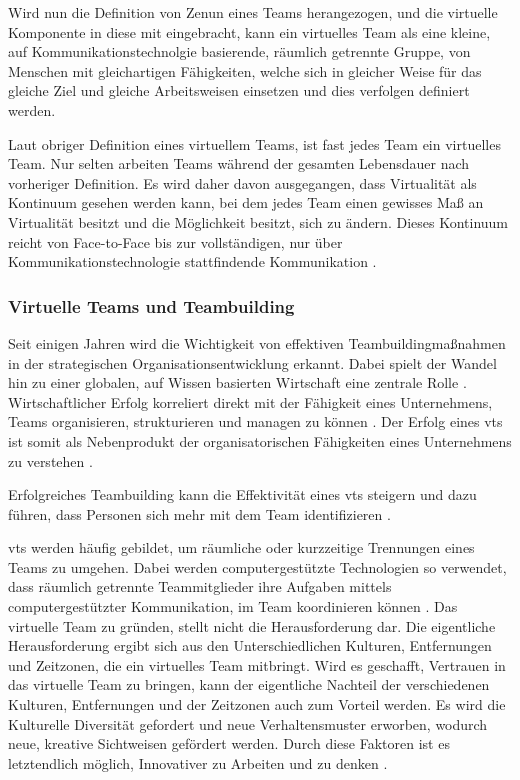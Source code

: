 \documentclass[a4paper,11pt]{article}%
\renewcommand{\\}{\vspace*{0.5\baselineskip} \newline}
\begin{document}
Wird nun die Definition von Zenun \citep[p.2]{zenun2007effects} eines Teams herangezogen, und die virtuelle Komponente in diese mit eingebracht, kann ein virtuelles Team als \\
\dq{}eine kleine, auf Kommunikationstechnolgie basierende, räumlich getrennte Gruppe, von Menschen mit gleichartigen Fähigkeiten, welche sich in gleicher Weise für das gleiche Ziel und gleiche Arbeitsweisen einsetzen und dies verfolgen\dq{} \\
definiert werden.

Laut obriger Definition eines virtuellem Teams, ist fast jedes Team ein virtuelles Team. Nur selten arbeiten Teams während der gesamten Lebensdauer nach vorheriger Definition. Es wird daher davon ausgegangen, dass Virtualität als Kontinuum gesehen werden kann, bei dem jedes Team einen gewisses Maß an Virtualität besitzt und die Möglichkeit besitzt, sich zu ändern. Dieses Kontinuum reicht von Face-to-Face bis zur vollständigen, nur über Kommunikationstechnologie stattfindende Kommunikation \cite{martins2004virtual}.
\subsubsection{Virtuelle Teams und Teambuilding}

Seit einigen Jahren wird die Wichtigkeit von effektiven Teambuildingmaßnahmen in der strategischen Organisationsentwicklung erkannt. Dabei spielt der Wandel hin zu einer globalen, auf Wissen basierten Wirtschaft eine zentrale Rolle \citep{belbin2011management} \citep[p.7]{katzenbach2015wisdom}.
Wirtschaftlicher Erfolg korreliert direkt mit der Fähigkeit eines Unternehmens, Teams organisieren, strukturieren und managen zu können \citep{pasmore1993designing}.
Der Erfolg eines \ac{vts} ist somit als Nebenprodukt der organisatorischen Fähigkeiten eines Unternehmens zu verstehen \citep[p.5]{kling1994social}.

Erfolgreiches Teambuilding kann die Effektivität eines \ac{vts} steigern und dazu führen, dass Personen sich mehr mit dem Team identifizieren \citep{kaiser2000student}.

\ac{vts} werden häufig gebildet, um räumliche oder kurzzeitige Trennungen eines Teams zu umgehen. Dabei werden computergestützte Technologien so verwendet, dass räumlich getrennte Teammitglieder ihre Aufgaben mittels computergestützter Kommunikation, im Team koordinieren können \citep[p. 117-119]{peters2007identifying} \citep[p. 1-2]{cascio2003leadership}.
Das virtuelle Team zu gründen, stellt nicht die Herausforderung dar. Die eigentliche Herausforderung ergibt sich aus den Unterschiedlichen Kulturen, Entfernungen und Zeitzonen, die ein virtuelles Team mitbringt. Wird es geschafft, Vertrauen in das virtuelle Team zu bringen, kann der eigentliche Nachteil der verschiedenen Kulturen, Entfernungen und der Zeitzonen auch zum Vorteil werden. Es wird die Kulturelle Diversität gefordert und neue Verhaltensmuster erworben, wodurch neue, kreative Sichtweisen gefördert werden. Durch diese Faktoren ist es letztendlich möglich, Innovativer zu Arbeiten und zu denken \citep{dyer1995team} \citep[p.405-416]{milliken1996searching}.
\end{document}
